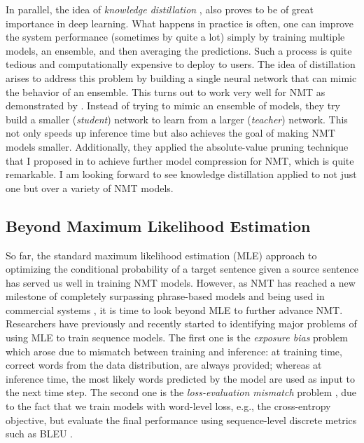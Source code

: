 In parallel, the idea of {\it knowledge distillation} \cite{hinton2015distilling}, also proves to be of great importance in deep learning. What happens in practice is often, one can improve the system performance (sometimes by quite a lot) simply by training multiple models, an ensemble, and then averaging the predictions. Such a process is quite tedious and computationally expensive to deploy to users. The idea of distillation arises to address this problem by building a single neural network that can mimic the behavior of an ensemble. This turns out to work very well for NMT as demonstrated by . Instead of trying to mimic an ensemble of models, they try build a smaller ({\it student}) network to learn from a larger ({\it teacher}) network. This not only speeds up inference time but also achieves the goal of making NMT models smaller. Additionally, they applied the absolute-value pruning technique that I proposed in  to achieve further model compression for NMT, which is quite remarkable. I am looking forward to see knowledge distillation applied to not just one but over a variety of NMT models.

\subsection{Beyond Maximum Likelihood Estimation}
So far, the standard maximum likelihood estimation (MLE) approach 
to optimizing the conditional probability of a target sentence given a source sentence 
has served us well in training NMT models. However, as NMT has reached a new milestone of completely surpassing phrase-based models and being used in commercial systems \cite{gnmt16,systran16}, it is time to look beyond MLE to further advance NMT. Researchers have previously and recently started to identifying major problems of using MLE to train sequence models. The first one is the {\it exposure bias} problem \cite{bengio15} which arose due to mismatch between training and inference: at training time, correct words from the data distribution, are always provided; whereas at inference time, the most likely words predicted by the model are used as input to the next time step. The second one is the {\it loss-evaluation mismatch} problem \cite{ranzato16}, due to the fact that we train models with word-level loss, e.g., the cross-entropy objective, but evaluate the final performance using sequence-level discrete metrics such as BLEU \cite{Papineni02bleu}. 

